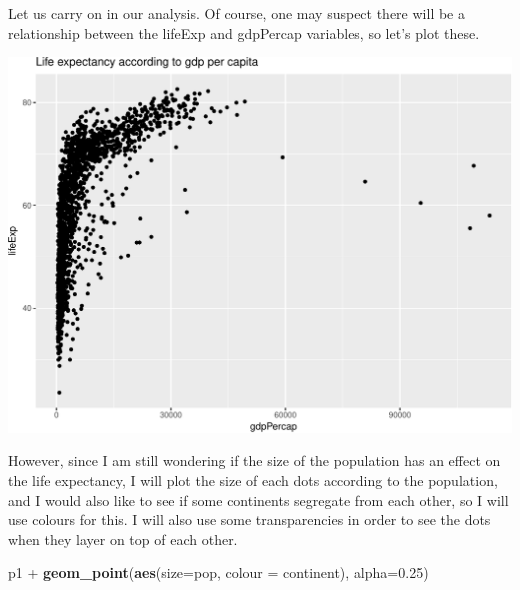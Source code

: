 \documentclass[]{article}
\newenvironment{Shaded}{\begin{snugshade}}{\end{snugshade}}
\newcommand{\KeywordTok}[1]{\textcolor[rgb]{0.13,0.29,0.53}{\textbf{{#1}}}}
\newcommand{\DataTypeTok}[1]{\textcolor[rgb]{0.13,0.29,0.53}{{#1}}}
\newcommand{\FloatTok}[1]{\textcolor[rgb]{0.00,0.00,0.81}{{#1}}}
\newcommand{\StringTok}[1]{\textcolor[rgb]{0.31,0.60,0.02}{{#1}}}
\newcommand{\NormalTok}[1]{{#1}}
\begin{document}
Let us carry on in our analysis. Of course, one may suspect there will
be a relationship between the lifeExp and gdpPercap variables, so let's
plot these.

\begin{Shaded}
\end{Shaded}

\includegraphics{gapminder-exploration-phase2_files/figure-latex/unnamed-chunk-14-1.pdf}

However, since I am still wondering if the size of the population has an
effect on the life expectancy, I will plot the size of each dots
according to the population, and I would also like to see if some
continents segregate from each other, so I will use colours for this. I
will also use some transparencies in order to see the dots when they
layer on top of each other.

\begin{Shaded}
\begin{Highlighting}[]
\NormalTok{p1 +}\StringTok{ }\KeywordTok{geom_point}\NormalTok{(}\KeywordTok{aes}\NormalTok{(}\DataTypeTok{size=}\NormalTok{pop, }\DataTypeTok{colour =} \NormalTok{continent), }\DataTypeTok{alpha=}\FloatTok{0.25}\NormalTok{)}
\end{Highlighting}
\end{Shaded}
\end{document}
